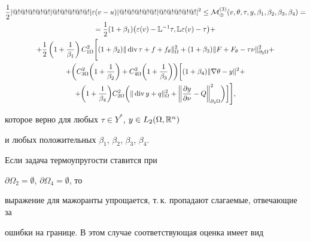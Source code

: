 \begin{multline*}


\frac{1}{2}\norme{\varepsilon(v-u)}^2 \le


{\cal M}^{(3)}_\oplus(v,\theta,\tau,y,\beta_1,\beta_2,\beta_3,\beta_4)=\\


%


=\frac{1}{2}(1+\beta_1) \big(\varepsilon(v) -{\Bbb


L}^{-1}\tau, {\Bbb L}\varepsilon(v) - \tau\big)+\\


%


+\frac{1}{2}\left(1+\frac{1}{\beta_1}\right) C_{1\Omega}^2 \Bigg[


(1+\beta_2)\norm{\Div \tau + f + f_\theta}^2_{\Omega}+


(1+\beta_3)\norm{F+F_\theta-\tau\nu}^2_{\partial_2\Omega} +\\


%


+\bigg(C_{3\Omega}^2\bigg(1+\frac{1}{\beta_2}\bigg)


+C_{4\Omega}^2\bigg(1+\frac{1}{\beta_3}\bigg)\bigg) \bigg[


(1+\beta_4) \norm{\nabla \theta - y}^2 +\\


%


+\bigg(1+\frac{1}{\beta_4} \bigg) C_{2\Omega}^2


\bigg(\norm{\Div y + q}^2_{\Omega} + \bigg\|\frac{\partial


y}{\partial \nu} - Q\bigg\|^2_{\partial_4\Omega} \bigg)\bigg]\Bigg],


\end{multline*}


которое верно для любых $\tau\in Y^*$, $y\in L_2(\Omega,{\Bbb R}^n)$


и любых положительных $\beta_1$, $\beta_2$, $\beta_3$, $\beta_4$.





Если задача термоупругости ставится при


$\partial \Omega_2 =\emptyset$, $\partial\Omega_4=\emptyset$, то


выражение для мажоранты упрощается, т.\,к. пропадают слагаемые, отвечающие за


ошибки на границе. В этом случае соответствующая оценка имеет вид


